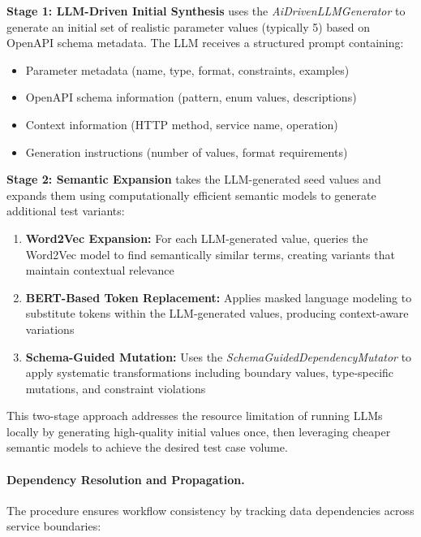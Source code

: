 \textbf{Stage 1: LLM-Driven Initial Synthesis} uses the
\emph{AiDrivenLLMGenerator} to generate an initial set of realistic
parameter values (typically 5) based on OpenAPI schema metadata.  The LLM
receives a structured prompt containing:
\begin{itemize}[leftmargin=*]
  \item Parameter metadata (name, type, format, constraints, examples)
  \item OpenAPI schema information (pattern, enum values, descriptions)
  \item Context information (HTTP method, service name, operation)
  \item Generation instructions (number of values, format requirements)
\end{itemize}

\textbf{Stage 2: Semantic Expansion} takes the LLM-generated seed values
and expands them using computationally efficient semantic models to
generate additional test variants:

\begin{enumerate}[leftmargin=*]
  \item \textbf{Word2Vec Expansion:} For each LLM-generated value,
        queries the Word2Vec model to find semantically similar terms,
        creating variants that maintain contextual relevance
  \item \textbf{BERT-Based Token Replacement:} Applies masked language
        modeling to substitute tokens within the LLM-generated values,
        producing context-aware variations
  \item \textbf{Schema-Guided Mutation:} Uses the
        \emph{SchemaGuidedDependencyMutator} to apply systematic
        transformations including boundary values, type-specific
        mutations, and constraint violations
\end{enumerate}

This two-stage approach addresses the resource limitation of running LLMs
locally by generating high-quality initial values once, then leveraging
cheaper semantic models to achieve the desired test case volume.

\paragraph{Dependency Resolution and Propagation.}
The  procedure ensures workflow consistency by
tracking data dependencies across service boundaries:

